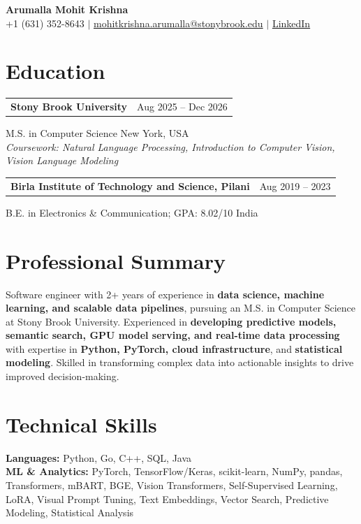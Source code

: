 \documentclass[letterpaper,10pt]{article}
\makeatletter
\newcommand{\entry}[2]{%
  \noindent
  \begin{tabularx}{\linewidth}
    {@{}>{\raggedright\arraybackslash}X@{\hspace{6pt}}r@{}}
    \textbf{#1} & #2
  \end{tabularx}\par
}
\makeatother
\begin{document}
\begin{center}
    {\LARGE\bfseries Arumalla Mohit Krishna}\\[3pt]
    +1 (631) 352-8643 $|$
    \href{mailto:mohitkrishna.arumalla@stonybrook.edu}
    {mohitkrishna.arumalla@stonybrook.edu} $|$
    \href{https://linkedin.com/in/mohit-krishna-arumalla}
    {LinkedIn}
\end{center}
\vspace{-8pt}

\section{Education}

\entry
  {\textbf{Stony Brook University}}
  {Aug 2025 -- Dec 2026}

M.S. in Computer Science \hfill New York, USA\\
\textit{
Coursework: Natural Language Processing,
Introduction to Computer Vision, Vision Language Modeling
}
\vspace{3pt}

\entry
  {\textbf{Birla Institute of Technology and Science, Pilani}}
  {Aug 2019 -- 2023}

B.E. in Electronics \& Communication; GPA: 8.02/10 \hfill India
\section{Professional Summary}

Software engineer with 2+ years of experience in \textbf{data science, machine learning, and scalable data pipelines}, pursuing an M.S. in Computer Science at Stony Brook University. Experienced in \textbf{developing predictive models, semantic search, GPU model serving, and real-time data processing} with expertise in \textbf{Python, PyTorch, cloud infrastructure}, and \textbf{statistical modeling}. Skilled in transforming complex data into actionable insights to drive improved decision-making.

\section{Technical Skills}

\textbf{Languages:}
Python, Go, C++, SQL, Java\\

\textbf{ML \& Analytics:}
PyTorch, TensorFlow/Keras, scikit-learn, NumPy, pandas,
Transformers, mBART, BGE, Vision Transformers,
Self-Supervised Learning, LoRA, Visual Prompt Tuning,
Text Embeddings, Vector Search, Predictive Modeling, Statistical Analysis\\
\end{document}
